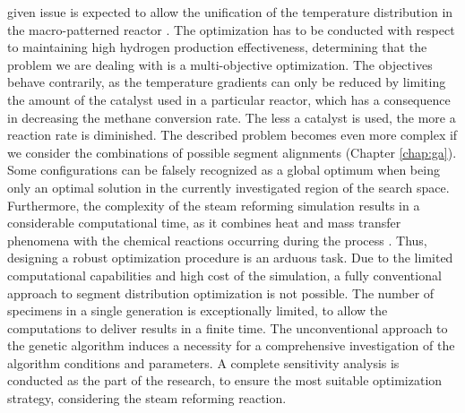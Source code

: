given issue is expected to allow the unification of the temperature distribution in the macro-patterned reactor \cite{Pajak2018}. The optimization has to be conducted with respect to maintaining high hydrogen production effectiveness, determining that the problem we are dealing with is a multi-objective optimization. The objectives behave contrarily, as the temperature gradients can only be reduced by limiting the amount of the catalyst used in a particular reactor, which has a consequence in decreasing the methane conversion rate. The less a catalyst is used, the more a reaction rate is diminished. The described problem becomes even more complex if we consider the combinations of possible segment alignments (Chapter \ref{chap:ga}). Some configurations can be falsely recognized as a global optimum when being only an optimal solution in the currently investigated region of the search space. Furthermore, the complexity of the steam reforming simulation results in a considerable computational time, as it combines heat and mass transfer phenomena with the chemical reactions occurring during the process \cite{Brus2012}. Thus, designing a robust optimization procedure is an arduous task. Due to the limited computational capabilities and high cost of the simulation, a fully conventional approach to segment distribution optimization is not possible. The number of specimens in a single generation is exceptionally limited, to allow the computations to deliver results in a finite time. The unconventional approach to the genetic algorithm induces a necessity for a comprehensive investigation of the algorithm conditions and parameters. A complete sensitivity analysis is conducted as the part of the research, to ensure the most suitable optimization strategy, considering the steam reforming reaction.
